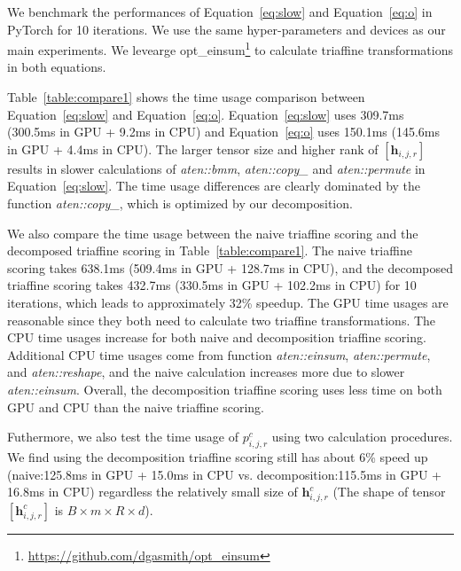 \documentclass[11pt]{article}
\begin{document}
We benchmark the performances of Equation~\ref{eq:slow} and Equation~\ref{eq:o} in PyTorch for 10 iterations.
We use the same hyper-parameters and devices as our main experiments.
We levearge opt\_einsum\footnote{\url{https://github.com/dgasmith/opt_einsum}} to calculate triaffine transformations in both equations.

Table~\ref{table:compare1} shows the time usage comparison between Equation~\ref{eq:slow} and Equation~\ref{eq:o}.
Equation~\ref{eq:slow} uses 309.7ms (300.5ms in GPU + 9.2ms in CPU) and Equation~\ref{eq:o} uses 150.1ms (145.6ms in GPU + 4.4ms in CPU).
The larger tensor size and higher rank of $[\mathbf{h}_{i,j,r}]$ results in slower calculations of \textit{aten::bmm}, \textit{aten::copy\_} and \textit{aten::permute} in Equation~\ref{eq:slow}.
The time usage differences are clearly dominated by the function \textit{aten::copy\_}, which is optimized by our decomposition.

We also compare the time usage between the naive triaffine scoring and the decomposed triaffine scoring in Table~\ref{table:compare1}.
The naive triaffine scoring takes 638.1ms (509.4ms in GPU + 128.7ms in CPU), and the decomposed triaffine scoring takes 432.7ms (330.5ms in GPU + 102.2ms in CPU) for 10 iterations, which leads to approximately 32\% speedup.
The GPU time usages are reasonable since they both need to calculate two triaffine transformations.
The CPU time usages increase for both naive and decomposition triaffine scoring.
Additional CPU time usages come from function \textit{aten::einsum}, \textit{aten::permute}, and \textit{aten::reshape}, and the naive calculation increases more due to slower \textit{aten::einsum}.
Overall, the decomposition triaffine scoring uses less time on both GPU and CPU than the naive triaffine scoring.

Futhermore, we also test the time usage of $p_{i,j,r}^c$ using two calculation procedures. We find using the decomposition triaffine scoring still has about 6\% speed up (naive:125.8ms in GPU + 15.0ms in CPU vs. decomposition:115.5ms in GPU + 16.8ms in CPU) regardless the relatively small size of $\mathbf{h}_{i,j,r}^c$ (The shape of tensor $[\mathbf{h}_{i,j,r}^c]$ is $B \times m \times R \times d$).
\end{document}
